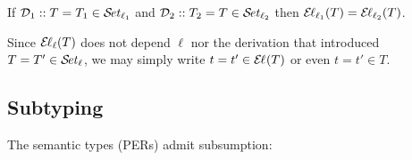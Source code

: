 \documentclass[acmlarge,review,anonymous]{acmart}\settopmatter{printfolios=true}
\newcommand{\LONGVERSION}[1]{}
\begin{document}
\begin{lemma}
\label{lem:indep}
  If\/ $\DD_1 :: T = T_1 \in \SET[\ell_1]$
  and $\DD_2 :: T_2 = T \in \SET[\ell_2]$ then $\EL[\ell_1](T) = \EL[\ell_2](T)$.
\end{lemma}
\LONGVERSION{
\begin{proof}
  By induction on $\DD_1$ and cases on $\DD_2$.
\end{proof}
}
Since $\EL[\ell](T)$ does not depend $\ell$ nor the derivation that introduced $T = T' \in \SET[\ell]$,  we may simply write $t = t' \in \EL(T)$ or even $t = t' \in T$.


\subsection{Subtyping}
\label{sec:subty}

The semantic types (PERs) admit subsumption:
\end{document}
